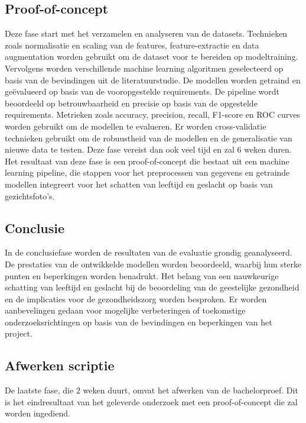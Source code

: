 \subsection{Proof-of-concept}
\label{sub:proof-of-concept}
Deze fase start met het verzamelen en analyseren van de datasets. Technieken zoals normalisatie en scaling van de features, feature-extractie en data augmentation worden gebruikt om de dataset voor te bereiden op modeltraining.
Vervolgens worden verschillende machine learning algoritmen geselecteerd op basis van de bevindingen uit de literatuurstudie. De modellen worden getraind en geëvalueerd op basis van de vooropgestelde requirements. 
De pipeline wordt beoordeeld op betrouwbaarheid en precisie op basis van de opgestelde requirements. Metrieken zoals accuracy, precision, recall, F1-score en ROC curves worden gebruikt om de modellen te evalueren.
Er worden cross-validatie technieken gebruikt om de robuustheid van de modellen en de generalisatie van nieuwe data te testen. 
Deze fase vereist dan ook veel tijd en zal 6 weken duren. Het resultaat van deze fase is een proof-of-concept die bestaat uit een machine learning pipeline, die stappen voor het preprocessen van gegevens en getrainde modellen integreert voor het schatten van leeftijd en geslacht op basis van gezichtsfoto's.

\subsection{Conclusie}
\label{sub:conclusie}
In de conclusiefase worden de resultaten van de evaluatie grondig geanalyseerd. De prestaties van de ontwikkelde modellen worden beoordeeld, waarbij hun sterke punten en beperkingen worden benadrukt. Het belang van een nauwkeurige schatting van leeftijd en geslacht bij de beoordeling van de geestelijke gezondheid en de implicaties voor de gezondheidszorg worden besproken. Er worden aanbevelingen gedaan voor mogelijke verbeteringen of toekomstige onderzoeksrichtingen op basis van de bevindingen en beperkingen van het project.
\subsection{Afwerken scriptie}
\label{sub:afwerken_scriptie}
De laatste fase, die 2 weken duurt, omvat het afwerken van de bachelorproef. Dit is het eindresultaat van het geleverde onderzoek met een proof-of-concept die zal worden ingediend. 


